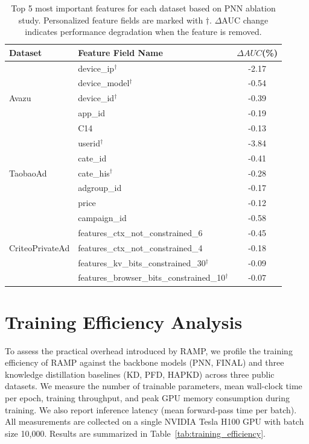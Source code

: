 \begin{table}[h]
    \centering
    \small
    \caption{Top 5 most important features for each dataset based on PNN ablation study. Personalized feature fields are marked with $\dagger$. $\Delta$AUC change indicates performance degradation when the feature is removed.}
    \label{tab:feature_importance}
    \begin{tabular}{l|l|c}
    \hline
    \textbf{Dataset} & \textbf{Feature Field Name} & \textbf{$\Delta{AUC}$(\%)} \\
    \hline
    \multirow{5}{*}{Avazu}
    & device\_ip$^\dagger$ & -2.17 \\
    & device\_model$^\dagger$ & -0.54 \\
    & device\_id$^\dagger$ & -0.39 \\
    & app\_id & -0.19 \\
    & C14 & -0.13 \\
    \hline
    \multirow{5}{*}{TaobaoAd}
    & userid$^\dagger$ & -3.84 \\
    & cate\_id & -0.41 \\
    & cate\_his$^\dagger$ & -0.28 \\
    & adgroup\_id & -0.17 \\
    & price & -0.12 \\
    \hline
    \multirow{5}{*}{CriteoPrivateAd}
    & campaign\_id & -0.58 \\
    & features\_ctx\_not\_constrained\_6 & -0.45 \\
    & features\_ctx\_not\_constrained\_4 & -0.18 \\
    & features\_kv\_bits\_constrained\_30$^\dagger$ & -0.09 \\
    & features\_browser\_bits\_constrained\_10$^\dagger$ & -0.07 \\
    \hline
    \end{tabular}
\end{table}

\section{Training Efficiency Analysis}
\label{sec:training_efficiency}
To assess the practical overhead introduced by RAMP, we profile the training efficiency of RAMP against the backbone models (PNN, FINAL) and three knowledge distillation baselines (KD, PFD, HAPKD) across three public datasets. We measure the number of trainable parameters, mean wall-clock time per epoch, training throughput, and peak GPU memory consumption during training. We also report inference latency (mean forward-pass time per batch). All measurements are collected on a single NVIDIA Tesla H100 GPU with batch size 10{,}000. Results are summarized in Table~\ref{tab:training_efficiency}.

